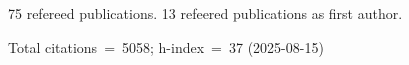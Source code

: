 75 refereed publications. 13 refeered publications as first author.

Total citations~=~5058; h-index~=~37 (2025-08-15)